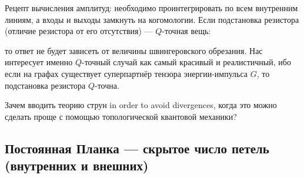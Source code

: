 \documentclass[11pt]{article}
\theoremstyle{remark}
\theoremstyle{definition}
\begin{document}
Рецепт вычисления амплитуд: необходимо проинтегрировать по всем внутренним линиям, а входы и выходы замкнуть на когомологии. Если подстановка резистора (отличие резистора от его отсутствия) --- $Q$-точная вещь:

\begin{center}
\end{center}

то ответ не будет зависеть от величины швингеровского обрезания. Нас интересует именно $Q$-точный случай как самый красивый и реалистичный, ибо если на графах существует суперпартнёр тензора энергии-импульса $G$, то подстановка резистора $Q$-точна.


\begin{center}
\end{center}

Зачем вводить теорию струн in order to avoid divergences, когда это можно сделать проще с помощью топологической квантовой механики?

\subsection{Постоянная Планка --- скрытое число петель (внутренних и внешних)}
\end{document}
